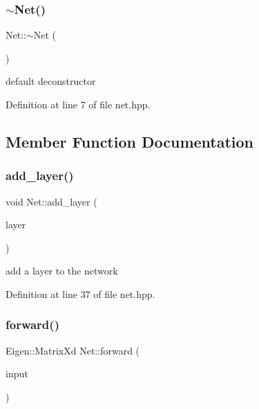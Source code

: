 \subsubsection{\texorpdfstring{$\sim$\+Net()}{~Net()}}
{\footnotesize\ttfamily Net\+::$\sim$\+Net (\begin{DoxyParamCaption}{ }\end{DoxyParamCaption})}



default deconstructor 



Definition at line 7 of file net.\+hpp.



\subsection{Member Function Documentation}
\mbox{\label{class_net_a81fa2c630d567b85e94a3ed007072007}} 
\subsubsection{\texorpdfstring{add\+\_\+layer()}{add\_layer()}}
{\footnotesize\ttfamily void Net\+::add\+\_\+layer (\begin{DoxyParamCaption}\item[{\hyperlink{class_layer}{Layer} $\ast$}]{layer }\end{DoxyParamCaption})}



add a layer to the network 



Definition at line 37 of file net.\+hpp.

\mbox{\label{class_net_a0e710c3df8334ac43caa4693ce464546}} 
\subsubsection{\texorpdfstring{forward()}{forward()}}
{\footnotesize\ttfamily Eigen\+::\+Matrix\+Xd Net\+::forward (\begin{DoxyParamCaption}\item[{const Eigen\+::\+Matrix\+Xd \&}]{input }\end{DoxyParamCaption})}


